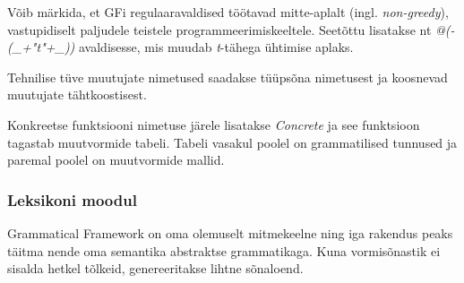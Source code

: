 \documentclass[12pt,a4paper]{article}
\begin{document}


Võib märkida, et GFi regulaaravaldised töötavad mitte-aplalt (ingl. \textit{non-greedy}), vastupidiselt paljudele teistele programmeerimis\-keeltele. Seetõttu lisatakse nt \textit{@(-(\_+"t"+\_))} avaldisesse, mis muudab \textit{t}-tähega ühtimise aplaks.

Tehnilise tüve muutujate nimetused saadakse tüüpsõna nimetusest ja koosnevad muutujate tähtkoostisest.

Konkreetse funktsiooni nimetuse järele lisatakse \textit{Concrete} ja see funktsioon tagastab muutvormide tabeli. Tabeli vasakul poolel on grammatilised tunnused ja paremal poolel on muutvormide mallid.




\subsubsection{Leksikoni moodul}
\label{sec:gf-leksikon}

Grammatical Framework on oma olemuselt mitmekeelne ning iga rakendus peaks täitma nende oma semantika abstraktse grammatikaga. Kuna vormisõnastik ei sisalda hetkel tõlkeid, genereeritakse lihtne sõnaloend.
\end{document}
